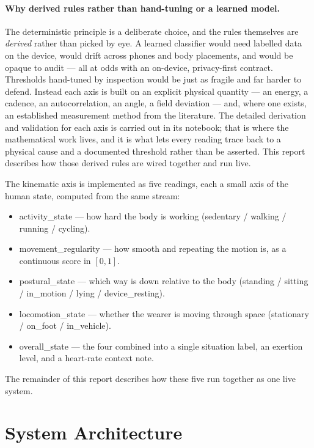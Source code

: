 \documentclass[11pt]{article}
\newcommand{\axis}[1]{\textsf{#1}}          %
\begin{document}
\paragraph{Why derived rules rather than hand-tuning or a learned model.}
The deterministic principle is a deliberate choice, and the rules themselves are
\emph{derived} rather than picked by eye. A learned classifier would need labelled data
on the device, would drift across phones and body placements, and would be opaque to
audit --- all at odds with an on-device, privacy-first contract. Thresholds hand-tuned
by inspection would be just as fragile and far harder to defend. Instead each axis is
built on an explicit physical quantity --- an energy, a cadence, an autocorrelation, an
angle, a field deviation --- and, where one exists, an established measurement method
from the literature. The detailed derivation and validation for each axis is carried out
in its notebook; that is where the mathematical work lives, and it is what lets every
reading trace back to a physical cause and a documented threshold rather than be
asserted. This report describes how those derived rules are wired together and run live.

The kinematic axis is implemented as five readings, each a small axis of the human
state, computed from the same stream:

\begin{itemize}
  \item \axis{activity\_state} --- how hard the body is working
        (sedentary / walking / running / cycling).
  \item \axis{movement\_regularity} --- how smooth and repeating the motion is,
        as a continuous score in $[0,1]$.
  \item \axis{postural\_state} --- which way is down relative to the body
        (standing / sitting / in\_motion / lying / device\_resting).
  \item \axis{locomotion\_state} --- whether the wearer is moving through space
        (stationary / on\_foot / in\_vehicle).
  \item \axis{overall\_state} --- the four combined into a single situation label,
        an exertion level, and a heart-rate context note.
\end{itemize}

The remainder of this report describes how these five run together as one live system.

\section{System Architecture}
\end{document}
